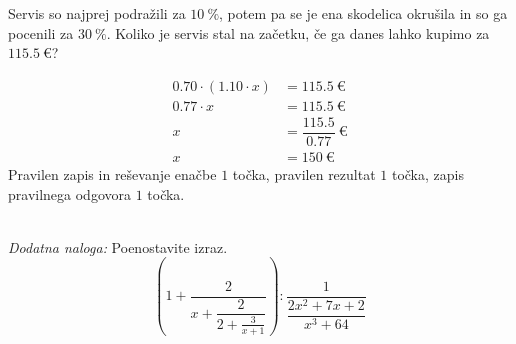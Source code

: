 \documentclass[addpoints]{exam}
\begin{document}
\begin{questions}


        \question[3]
        Servis so najprej podražili za $10~\%$, potem pa se je ena skodelica okrušila in so
        ga pocenili za $30~\%$. Koliko je servis stal na začetku, če ga danes lahko kupimo za $115.5~\euro$?

        \begin{solution}[6cm]
            \begin{align*}
                0.70\cdot \left(1.10\cdot x\right) &=115.5~\euro \\
                                     0.77 \cdot x &= 115.5~\euro \\
                                                x &= \dfrac{115.5}{0.77}~\euro \\
                                                x &= 150~\euro
            \end{align*}
            Pravilen zapis in reševanje enačbe $1$ točka, pravilen rezultat $1$ točka, zapis pravilnega odgovora $1$ točka.
        \end{solution}
     ~\\


    \bonusquestion[4]
    \textit{Dodatna naloga:} Poenostavite izraz. $$\left(1+\dfrac{2}{x+\dfrac{2}{2+\frac{3}{x+1}}}\right):\dfrac{1}{\dfrac{2x^2+7x+2}{x^3+64}}$$


\end{questions}
\end{document}
